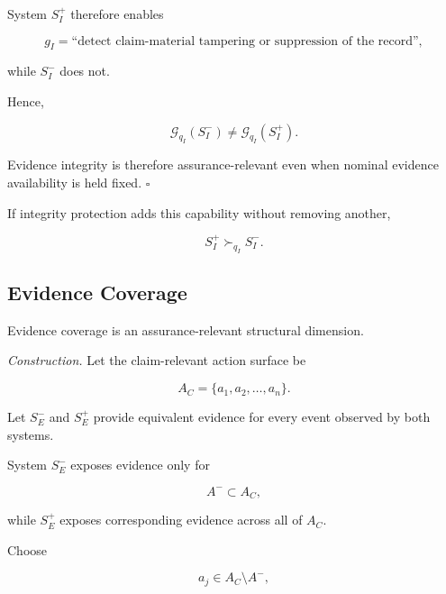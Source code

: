 System \(S_I^{+}\) therefore enables

\begin{equation}
  g_I
  =
  \text{``detect claim-material tampering or suppression of the record''},
\end{equation}

while \(S_I^{-}\) does not.

Hence,

\begin{equation}
  \mathcal{G}_{q_I}(S_I^{-})
  \neq
  \mathcal{G}_{q_I}(S_I^{+}).
\end{equation}

Evidence integrity is therefore assurance-relevant even when nominal evidence availability is held fixed.
\hfill\(\square\)

If integrity protection adds this capability without removing another,

\begin{equation}
  S_I^{+}
  \succ_{q_I}
  S_I^{-}.
\end{equation}

\subsection{Evidence Coverage}
\label{aa.subsec.evidence-coverage-contribution}

\begin{proposition}
  \label{se320.prop.EvidenceCoverageContribution}
  Evidence coverage is an assurance-relevant structural dimension.
\end{proposition}

\textit{Construction.}
Let the claim-relevant action surface be

\begin{equation}
  A_C
  =
  \{
  a_1,a_2,\ldots,a_n
  \}.
\end{equation}

Let \(S_E^{-}\) and \(S_E^{+}\) provide equivalent evidence for every event observed by both systems.

System \(S_E^{-}\) exposes evidence only for

\begin{equation}
  A^{-}
  \subset
  A_C,
\end{equation}

while \(S_E^{+}\) exposes corresponding evidence across all of \(A_C\).

Choose

\begin{equation}
  a_j
  \in
  A_C
  \setminus
  A^{-},
\end{equation}

